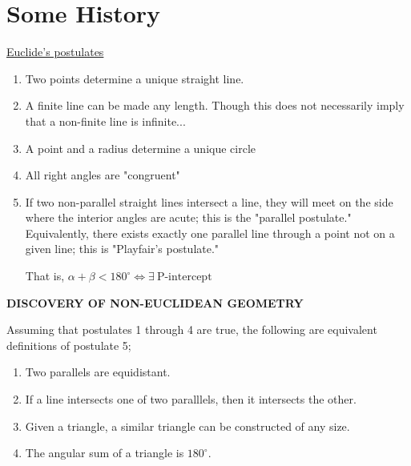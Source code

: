 \documentclass{book}
\begin{document}
\chapter{Some History}

\underline{Euclide's postulates}

\vspace{10pt}

\begin{enumerate}
\item Two points determine a unique straight  line.
\item A finite line can be made any length. Though this does not necessarily imply that a non-finite line is infinite...
\item A point and a radius determine a unique circle
\item All right angles are "congruent"
\item If two non-parallel straight lines intersect a line, they will meet on the side where the interior angles are acute; this is the "parallel postulate." Equivalently, there exists exactly one parallel line through a point not on a given line; this is "Playfair's postulate."

That is, $\alpha+\beta<180^\circ\iff\exists\ \mbox{P-intercept}$

\begin{center}
\end{center}
\end{enumerate}

\newpage

{\bf{}\Large DISCOVERY OF NON-EUCLIDEAN GEOMETRY}

\vspace{10pt}

Assuming that postulates 1 through 4 are true, the following are equivalent definitions of postulate 5;

\begin{enumerate}[label=(\alph*)]
\item Two parallels are equidistant.
\item If a line intersects one of two paralllels, then it intersects the other.
\item Given a triangle, a similar triangle can be constructed of any size.
\item The angular sum of a triangle is $180^\circ$.
\end{enumerate}
\end{document}

